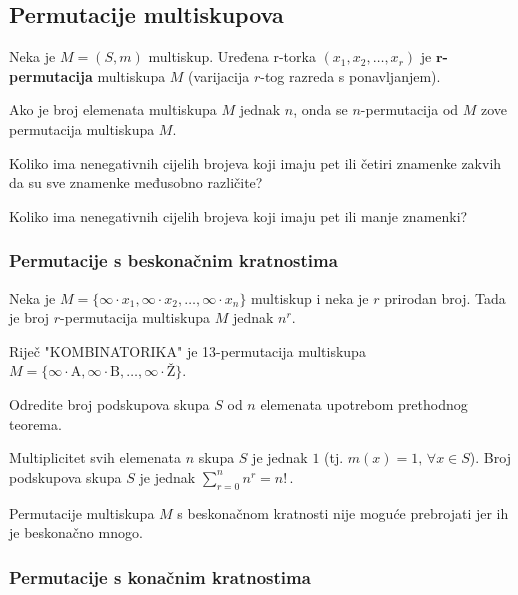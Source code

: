 \subsection{Permutacije multiskupova}

Neka je $M = (S, m)$ multiskup. Uređena r-torka $(x_1, x_2, \dots, x_r)$ je
\textbf{$\mathbf{r}$-permutacija} multiskupa $M$ (varijacija $r$-tog razreda s
ponavljanjem).

Ako je broj elemenata multiskupa $M$ jednak $n$, onda se $n$-permutacija od $M$
zove permutacija multiskupa $M$.

\begin{example}
    Koliko ima nenegativnih cijelih brojeva koji imaju pet ili četiri znamenke
    zakvih da su sve znamenke međusobno različite?
\end{example}

\begin{example}
    Koliko ima nenegativnih cijelih brojeva koji imaju pet ili manje znamenki?
\end{example}

\subsubsection{Permutacije s beskonačnim kratnostima}

\begin{theorem}
    Neka je $M = \{\infty \cdot x_1, \infty \cdot x_2, \dots, \infty \cdot
    x_n\}$ multiskup i neka je $r$ prirodan broj. Tada je broj $r$-permutacija
    multiskupa $M$ jednak $n^r$.
\end{theorem}

\begin{example}
    Riječ "KOMBINATORIKA" je 13-permutacija multiskupa $M = \{\infty \cdot
    \text{A}, \infty \cdot \text{B}, \dots, \infty \cdot \text{Ž}\}$.
\end{example}

\begin{example}
    Odredite broj podskupova skupa $S$ od $n$ elemenata upotrebom prethodnog
    teorema.
\end{example}

Multiplicitet svih elemenata $n$ skupa $S$ je jednak $1$ (tj. $m(x) = 1,\, \forall x \in S$). Broj podskupova skupa $S$ je jednak $\sum_{r=0}^{n} n^r = n!\,$.

\bigskip
Permutacije multiskupa $M$ s beskonačnom kratnosti nije moguće prebrojati jer ih
je beskonačno mnogo.

\subsubsection{Permutacije s konačnim kratnostima}

